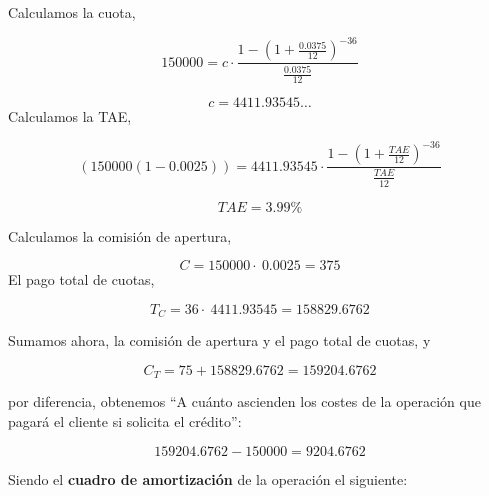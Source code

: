 \documentclass[
  letterpaper,
  DIV=11,
  numbers=noendperiod]{scrreprt}
\begin{document}
\begin{tcolorbox}
\begin{tcolorbox}
Calculamos la cuota,

\[150000=c\cdot\frac{1-\left(1+\frac{0.0375}{12}\right)^{-36}}{\frac{0.0375}{12}}\]

\[c=4411.93545\dots \] Calculamos la TAE,

\[(150000(1-0.0025))=4411.93545\cdot\frac{1-\left(1+\frac{TAE}{12}\right)^{-36}}{\frac{TAE}{12}}\]

\[TAE=3.99\% \]

Calculamos la comisión de apertura,

\[C=150000\cdot \:0.0025=375\] El pago total de cuotas,

\[T_C= 36\cdot \:4411.93545=158829.6762\]

Sumamos ahora, la comisión de apertura y el pago total de cuotas, y

\[C_T=75+158829.6762=159204.6762\]

por diferencia, obtenemos ``A cuánto ascienden los costes de la
operación que pagará el cliente si solicita el crédito'':

\[159204.6762-150000=9204.6762\]

Siendo el \textbf{cuadro de amortización} de la operación el siguiente:


\end{tcolorbox}
\end{tcolorbox}
\end{document}

